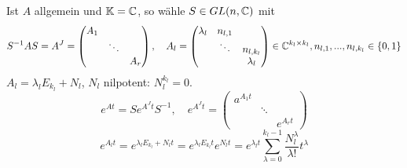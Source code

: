 Ist $ A $ allgemein und $ \mathbb{K}=\mathbb{C} $, so w\"ahle $ S\in GL(n,\mathbb{C}) $ mit \[ S^{-1}AS=A^J=\begin{pmatrix}
A_1\\&\ddots\\&&A_r
\end{pmatrix},\quad A_l=\begin{pmatrix}
\lambda_l&n_{l,1}\\&\ddots&n_{l,k_l}\\&&\lambda_l
\end{pmatrix}\in\mathbb{C}^{k_l\times k_l}, n_{l,1},...,n_{l,k_l}\in\lbrace 0,1\rbrace \]
$ A_l=\lambda_l E_{k_l}+N_l $, $ N_l $ nilpotent: $ N^{k_l}_l=0 $.
\[ e^{At}=Se^{A^Jt}S^{-1},\quad e^{A^Jt}=\begin{pmatrix}
a^{A_1t}\\&\ddots\\&&e^{A_rt}
\end{pmatrix} \]
\[ e^{A_lt}=e^{\lambda_l E_{k_l}+N_lt}=e^{\lambda_l E_{k_l}t}e^{N_lt}=e^{\lambda_l t}\sum_{\lambda=0}^{k_l-1}\frac{N_l^\lambda}{\lambda!}t^\lambda \]
